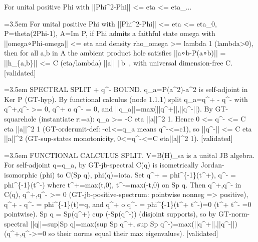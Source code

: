 \documentclass{article}
\newcommand{\step}[1]{\par\noindent\hangindent=3.5em\hangafter=1%
  \makebox[3.5em][l]{\textbf{#1.}}}
\newcommand{\steptag}[1]{\hfill{\small\textsf{[#1]}}}
\begin{document}
\begin{proofbox}{For unital positive Phi with ||Phi\textasciicircum{}2-Phi|| <= eta <= eta\_...}
\step{1} For unital positive Phi with ||Phi\textasciicircum{}2-Phi|| <= eta <= eta\_0, P=theta(2Phi-1), A=Im P, if Phi admits a faithful state omega with ||omega∘Phi-omega|| <= eta and density rho\_omega >= lambda 1 (lambda>0), then for all a,b in A the ambient product hole satisfies ||a∘b-P(a∘b)|| = ||h\_\{a,b\}|| <= C (eta/lambda) ||a|| ||b||, with universal dimension-free C. \steptag{validated} \\[6pt]
\step{1.1} SPECTRAL SPLIT + q\textasciicircum{}- BOUND. q\_a=P(a\textasciicircum{}2)-a\textasciicircum{}2 is self-adjoint in Ker P (GT-hyp). By functional calculus (node 1.1.1) split q\_a=q\textasciicircum{}+ - q\textasciicircum{}- with q\textasciicircum{}+,q\textasciicircum{}- >= 0, q\textasciicircum{}+ o q\textasciicircum{}- = 0, and ||q\_a||=max(||q\textasciicircum{}+||,||q\textasciicircum{}-||). By GT-squarehole (instantiate r:=a): q\_a >= -C eta ||a||\textasciicircum{}2 1. Hence 0 <= q\textasciicircum{}- <= C eta ||a||\textasciicircum{}2 1 (GT-orderunit-def: -c1<=q\_a means q\textasciicircum{}-<=c1), so ||q\textasciicircum{}-|| <= C eta ||a||\textasciicircum{}2 (GT-sup-states monotonicity, 0<=q\textasciicircum{}-<=C eta||a||\textasciicircum{}2 1). \steptag{validated} \\[6pt]
\step{1.1.1} FUNCTIONAL CALCULUS SPLIT. V=B(H)\_sa is a unital JB algebra. For self-adjoint q=q\_a, by GT-jb-spectral C(q) is isometrically Jordan-isomorphic (phi) to C(Sp q), phi(q)=iota. Set q\textasciicircum{}+ = phi\textasciicircum{}\{-1\}(t\textasciicircum{}+), q\textasciicircum{}- = phi\textasciicircum{}\{-1\}(t\textasciicircum{}-) where t\textasciicircum{}+=max(t,0), t\textasciicircum{}-=max(-t,0) on Sp q. Then q\textasciicircum{}+,q\textasciicircum{}- in C(q), q\textasciicircum{}+,q\textasciicircum{}- >= 0 (GT-jb-positive-spectrum: pointwise nonneg => positive), q\textasciicircum{}+ - q\textasciicircum{}- = phi\textasciicircum{}\{-1\}(t)=q, and q\textasciicircum{}+ o q\textasciicircum{}- = phi\textasciicircum{}\{-1\}(t\textasciicircum{}+ t\textasciicircum{}-)=0 (t\textasciicircum{}+ t\textasciicircum{}- =0 pointwise). Sp q = Sp(q\textasciicircum{}+) cup (-Sp(q\textasciicircum{}-)) (disjoint supports), so by GT-norm-spectral ||q||=sup|Sp q|=max(sup Sp q\textasciicircum{}+, sup Sp q\textasciicircum{}-)=max(||q\textasciicircum{}+||,||q\textasciicircum{}-||) (q\textasciicircum{}+,q\textasciicircum{}->=0 so their norms equal their max eigenvalues). \steptag{validated} \\[4pt]

\end{proofbox}
\end{document}
